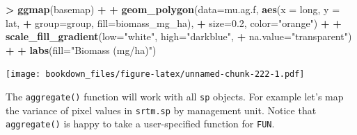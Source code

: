 \documentclass[]{krantz}
\makeatletter
\newenvironment{Shaded}{\begin{snugshade}}{\end{snugshade}}
\newcommand{\KeywordTok}[1]{\textcolor[rgb]{0.27,0.27,0.27}{\textbf{#1}}}
\newcommand{\DataTypeTok}[1]{\textcolor[rgb]{0.27,0.27,0.27}{#1}}
\newcommand{\FloatTok}[1]{\textcolor[rgb]{0.06,0.06,0.06}{#1}}
\newcommand{\StringTok}[1]{\textcolor[rgb]{0.5,0.5,0.5}{#1}}
\newcommand{\ControlFlowTok}[1]{\textcolor[rgb]{0.27,0.27,0.27}{\textbf{#1}}}
\newcommand{\OperatorTok}[1]{\textcolor[rgb]{0.43,0.43,0.43}{\textbf{#1}}}
\newcommand{\ErrorTok}[1]{\textcolor[rgb]{0.14,0.14,0.14}{\textbf{#1}}}
\newcommand{\NormalTok}[1]{#1}
\newenvironment{kframe}{%
\medskip{}
\setlength{\fboxsep}{.8em}
 \def\at@end@of@kframe{}%
 \ifinner\ifhmode%
  \def\at@end@of@kframe{\end{minipage}}%
  \begin{minipage}{\columnwidth}%
 \fi\fi%
 \def\FrameCommand##1{\hskip\@totalleftmargin \hskip-\fboxsep
 \colorbox{shadecolor}{##1}\hskip-\fboxsep
     \hskip-\linewidth \hskip-\@totalleftmargin \hskip\columnwidth}%
 \MakeFramed {\advance\hsize-\width
   \@totalleftmargin\z@ \linewidth\hsize
   \@setminipage}}%
 {\par\unskip\endMakeFramed%
 \at@end@of@kframe}
\renewenvironment{Shaded}{\begin{kframe}}{\end{kframe}}
\makeatother
\begin{document}
\begin{Shaded}
\begin{Highlighting}[]
\OperatorTok{>}\StringTok{ }\KeywordTok{ggmap}\NormalTok{(basemap) }\OperatorTok{+}
\OperatorTok{+}\StringTok{     }\KeywordTok{geom_polygon}\NormalTok{(}\DataTypeTok{data=}\NormalTok{mu.ag.f, }\KeywordTok{aes}\NormalTok{(}\DataTypeTok{x =}\NormalTok{ long, }\DataTypeTok{y =}\NormalTok{ lat, }
\OperatorTok{+}\StringTok{                                 }\DataTypeTok{group=}\NormalTok{group, }\DataTypeTok{fill=}\NormalTok{biomass_mg_ha), }
\OperatorTok{+}\StringTok{                  }\DataTypeTok{size=}\FloatTok{0.2}\NormalTok{, }\DataTypeTok{color=}\StringTok{"orange"}\NormalTok{) }\OperatorTok{+}
\OperatorTok{+}\StringTok{     }\KeywordTok{scale_fill_gradient}\NormalTok{(}\DataTypeTok{low=}\StringTok{"white"}\NormalTok{, }\DataTypeTok{high=}\StringTok{"darkblue"}\NormalTok{, }
\OperatorTok{+}\StringTok{                         }\DataTypeTok{na.value=}\StringTok{"transparent"}\NormalTok{) }\OperatorTok{+}
\OperatorTok{+}\StringTok{     }\KeywordTok{labs}\NormalTok{(}\DataTypeTok{fill=}\StringTok{"Biomass (mg/ha)"}\NormalTok{)}
\end{Highlighting}
\end{Shaded}

\texttt{[image: bookdown\_files/figure-latex/unnamed-chunk-222-1.pdf]}

The \texttt{aggregate()} function will work with all \texttt{sp}
objects. For example let's map the variance of pixel values in
\texttt{srtm.sp} by management unit. Notice that \texttt{aggregate()} is
happy to take a user-specified function for \texttt{FUN}.

\begin{Shaded}
\end{Shaded}
\end{document}
